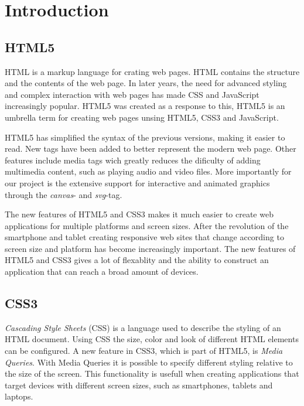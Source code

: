 \chapter{Introduction} %

\label{Chapter2} %


\section{HTML5}
HTML is a markup language for crating web pages. HTML contains the structure and the contents of the web page. In later years, the need for advanced styling and complex interaction with web pages has made CSS and JavaScript increasingly popular. HTML5 was created as a response to this, HTML5 is an umbrella term for creating web pages unsing HTML5, CSS3 and JavaScript.

HTML5 has simplified the syntax of the previous versions, making it easier to read. New tags have been added to better represent the modern web page. Other features include media tags wich greatly reduces the dificulty of adding multimedia content, such as playing audio and video files. More importantly for our project is the extensive support for interactive and animated graphics through the \emph{canvas}- and \emph{svg}-tag.

The new features of HTML5 and CSS3 makes it much easier to create web applications for multiple platforms and screen sizes. After the revolution of the smartphone and tablet creating responsive web sites that change according to screen size and platform has become increasingly important. The new features of HTML5 and CSS3 gives a lot of flexablity and the ability to construct an application that can reach a broad amount of devices.

\section{CSS3}
\emph{Cascading Style Sheets} (CSS) is a language used to describe the styling of an HTML document. Using CSS the size, color and look of different HTML elements can be configured. A new feature in CSS3, which is part of HTML5, is \emph{Media Queries}. With Media Queries it is possible to specify different styling relative to the size of the screen. This functionality is usefull when creating applications that target devices with different screen sizes, such as smartphones, tablets and laptops. 


